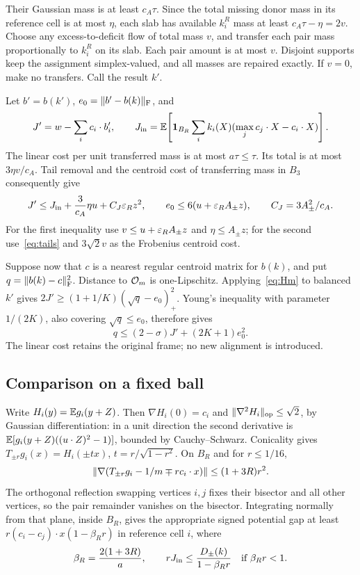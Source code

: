 Their Gaussian mass is at least $c_A\tau$.
Since the total missing donor mass in its reference cell is at most $\eta$,
each slab has available $k_i^R$ mass at least $c_A\tau-\eta=2v$.
Choose any excess-to-deficit flow of total mass $v$, and transfer each pair
mass proportionally to $k_i^R$ on its slab. Each pair amount is at most $v$.
Disjoint supports keep the assignment simplex-valued, and all masses are
repaired exactly. If $v=0$, make no transfers. Call the result $k'$.

Let $b'=b(k')$, $e_0=\lVert b'-b(k)\rVert_{\mathrm F}$, and
\[
 J'=w-\sum_i c_i\cdot b_i',\qquad
 J_{\rm in}=\mathbb E\!\left[\mathbf 1_{B_R}\sum_i k_i(X)
                  (\max_j c_j\cdot X-c_i\cdot X)\right].
\]
The linear cost per unit transferred mass is at most $a\tau\leq\tau$.
Its total is at most $3\eta v/c_A$. Tail removal and the centroid cost of
transferring mass in $B_3$ consequently give
\begin{equation}\label{eq:repair-bounds}
 J'\leq J_{\rm in}+\frac3{c_A}\eta u+C_J\varepsilon_Rz^2,\qquad
 e_0\leq6(u+\varepsilon_RA_\pm z),\qquad C_J=3A_\pm^2/c_A.
\end{equation}
For the first inequality use $v\leq u+\varepsilon_RA_\pm z$ and
$\eta\leq A_\pm z$; for the second use~\eqref{eq:tails} and
$3\sqrt2v$ as the Frobenius centroid cost.

Suppose now that $c$ is a nearest regular centroid matrix for $b(k)$,
and put $q=\lVert b(k)-c\rVert_{\mathrm F}^2$.
Distance to $\mathcal O_m$ is one-Lipschitz. Applying~\eqref{eq:Hm} to balanced $k'$
gives
$2J'\geq(1+1/K)(\sqrt q-e_0)_+^2$.
Young's inequality with parameter $1/(2K)$, also covering $\sqrt q\leq e_0$,
therefore gives
\begin{equation}\label{eq:repair-coercivity}
 q\leq(2-\sigma)J'+(2K+1)e_0^2.
\end{equation}
The linear cost retains the original frame; no new alignment is introduced.

\subsection{Comparison on a fixed ball}
Write $H_i(y)=\mathbb E g_i(y+Z)$. Then $\nabla H_i(0)=c_i$ and
$\lVert \nabla^2H_i\rVert_{\rm op}\leq\sqrt2$, by Gaussian differentiation:
in a unit direction the second derivative is
$\mathbb E[g_i(y+Z)((u\cdot Z)^2-1)]$, bounded by Cauchy--Schwarz.
Conicality gives $T_{\pm r}g_i(x)=H_i(\pm tx)$,
$t=r/\sqrt{1-r^2}$. On $B_R$ and for $r\leq1/16$,
\[
 \lVert \nabla(T_{\pm r}g_i-1/m\mp r c_i\cdot x)\rVert
 \leq(1+3R)r^2.
\]
The orthogonal reflection swapping vertices $i,j$ fixes their bisector and
all other vertices, so the pair remainder vanishes on the bisector.
Integrating normally from that plane, inside $B_R$, gives the appropriate
signed potential gap at least
$r(c_i-c_j)\cdot x(1-\beta_Rr)$ in reference cell $i$, where
\begin{equation}\label{eq:compact}
 \beta_R=\frac{2(1+3R)}a,\qquad
 rJ_{\rm in}\leq\frac{D_\pm(k)}{1-\beta_Rr}
 \quad\hbox{if }\beta_Rr<1.
\end{equation}

